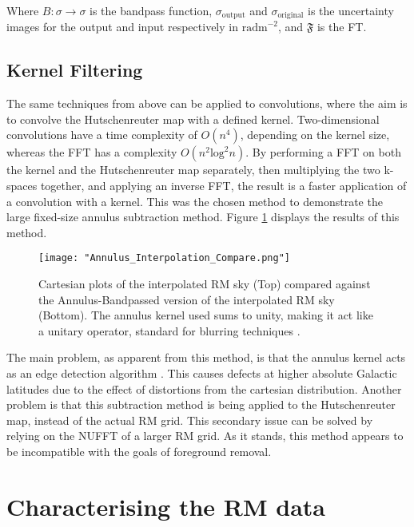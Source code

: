 Where $B\colon\sigma\rightarrow\sigma$ is the bandpass function, $\sigma_{\mathrm{output}}$ and $\sigma_{\mathrm{original}}$ is the uncertainty images for the output and input respectively in $\mathrm{rad m}^{-2}$, and $\mathbf{\mathfrak{F}}$ is the FT.

\subsection{Kernel Filtering}
\label{ssec:kernel}

The same techniques from above can be applied to convolutions, where the aim is to convolve the Hutschenreuter map with a defined kernel. Two-dimensional convolutions have a time complexity of $O(n^4)$, depending on the kernel size, whereas the FFT has a complexity $O(n^2 \mathrm{log}^2 n)$. By performing a FFT on both the kernel and the Hutschenreuter map separately, then multiplying the two k-spaces together, and applying an inverse FFT, the result is a faster application of a convolution with a kernel. This was the chosen method to demonstrate the large fixed-size annulus subtraction method. Figure \ref{fig:annulus_interpolation} displays the results of this method.

\begin{figure}
    \texttt{[image: "Annulus\_Interpolation\_Compare.png"]}
    \centering
    \caption{Cartesian plots of the interpolated RM sky (Top) compared against the Annulus-Bandpassed version of the interpolated RM sky (Bottom). The annulus kernel used sums to unity, making it act like a unitary operator, standard for blurring techniques \citep{ID38}.}
    \label{fig:annulus_interpolation}
\end{figure}

The main problem, as apparent from this method, is that the annulus kernel acts as an edge detection algorithm \citep{ID38}. This causes defects at higher absolute Galactic latitudes due to the effect of distortions from the cartesian distribution. Another problem is that this subtraction method is being applied to the Hutschenreuter map, instead of the actual RM grid. This secondary issue can be solved by relying on the NUFFT of a larger RM grid. As it stands, this method appears to be incompatible with the goals of foreground removal.

\section{Characterising the RM data}
\label{sec:charm}

